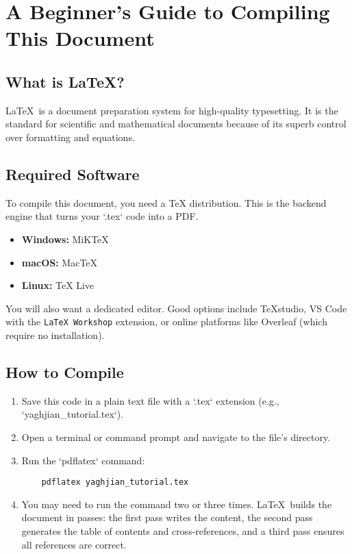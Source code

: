 \documentclass[11pt]{article}
\begin{document}
\appendix
\section{A Beginner's Guide to Compiling This Document}
\subsection{What is \LaTeX?}
\LaTeX\ is a document preparation system for high-quality typesetting. It is the standard for scientific and mathematical documents because of its superb control over formatting and equations.

\subsection{Required Software}
To compile this document, you need a TeX distribution. This is the backend engine that turns your `.tex` code into a PDF.
\begin{itemize}
    \item \textbf{Windows:} MiKTeX
    \item \textbf{macOS:} MacTeX
    \item \textbf{Linux:} TeX Live
\end{itemize}
You will also want a dedicated editor. Good options include TeXstudio, VS Code with the \texttt{LaTeX Workshop} extension, or online platforms like Overleaf (which require no installation).

\subsection{How to Compile}
\begin{enumerate}
    \item Save this code in a plain text file with a `.tex` extension (e.g., `yaghjian\_tutorial.tex`).
    \item Open a terminal or command prompt and navigate to the file's directory.
    \item Run the `pdflatex` command:
    \begin{verbatim}
    pdflatex yaghjian_tutorial.tex
    \end{verbatim}
    \item You may need to run the command two or three times. \LaTeX\ builds the document in passes: the first pass writes the content, the second pass generates the table of contents and cross-references, and a third pass ensures all references are correct.
\end{enumerate}
\end{document}
